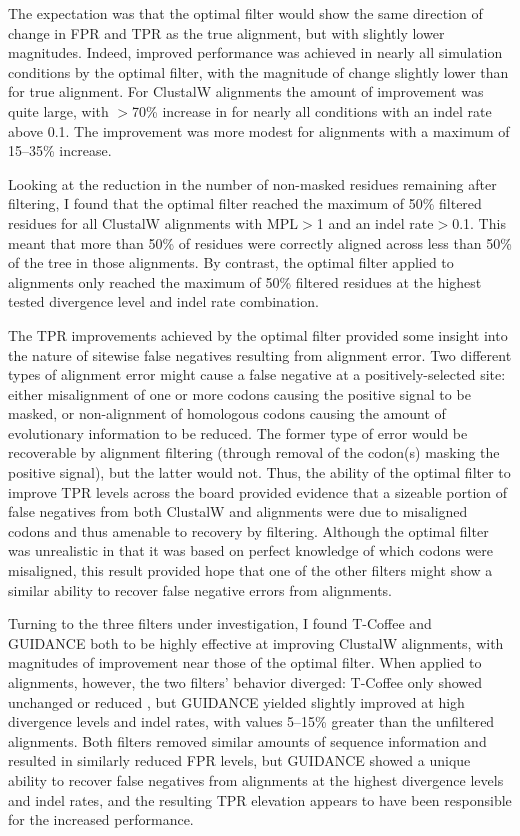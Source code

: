 The expectation was that the optimal filter would show the same
direction of change in FPR and TPR as the true alignment, but with
slightly lower magnitudes. Indeed, improved \sw performance was
achieved in nearly all simulation conditions by the optimal filter,
with the magnitude of \tpr change slightly lower than for true
alignment. For ClustalW alignments the amount of improvement was quite
large, with $>$70\% increase in \tpr for nearly all conditions with an
indel rate above 0.1. The improvement was more modest for \prankc
alignments with a maximum of 15--35\% \tpr increase.

Looking at the reduction in the number of non-masked residues
remaining after filtering, I found that the optimal filter reached
the maximum of 50\% filtered residues for all ClustalW alignments with
MPL$>$1 and an indel rate$>$0.1. This meant that more than 50\% of
residues were correctly aligned across less than 50\% of the tree in
those alignments. By contrast, the optimal filter applied to \prankc
alignments only reached the maximum of 50\% filtered residues at the
highest tested divergence level and indel rate combination.

The TPR improvements achieved by the optimal filter provided some
insight into the nature of sitewise false negatives resulting from
alignment error. Two different types of alignment error might cause a
false negative at a positively-selected site: either misalignment of
one or more \nh codons causing the positive signal to be
masked, or non-alignment of homologous codons causing the amount of
evolutionary information to be reduced. The former type of error would
be recoverable by alignment filtering (through removal of the codon(s)
masking the positive signal), but the latter would not. Thus, the
ability of the optimal filter to improve TPR levels across the board
provided evidence that a sizeable portion of false negatives from both
ClustalW and \prankc alignments were due to misaligned codons and thus
amenable to recovery by filtering. Although the optimal filter was
unrealistic in that it was based on perfect knowledge of which codons
were misaligned, this result provided hope that one of the other
filters might show a similar ability to recover false negative errors
from \prankc alignments.

Turning to the three filters under investigation, I found T-Coffee
and GUIDANCE both to be highly effective at improving ClustalW
alignments, with magnitudes of improvement near those of the optimal
filter. When applied to \prankc alignments, however, the two filters'
behavior diverged: T-Coffee only showed unchanged or reduced \tpr, but
GUIDANCE yielded slightly improved \tpr at high divergence levels and
indel rates, with values 5--15\% greater than the unfiltered \prankc
alignments. Both filters removed similar amounts of sequence
information and resulted in similarly reduced FPR levels, but GUIDANCE
showed a unique ability to recover false negatives from \prankc
alignments at the highest divergence levels and indel rates, and the
resulting TPR elevation appears to have been responsible for the
increased \tpr performance.

